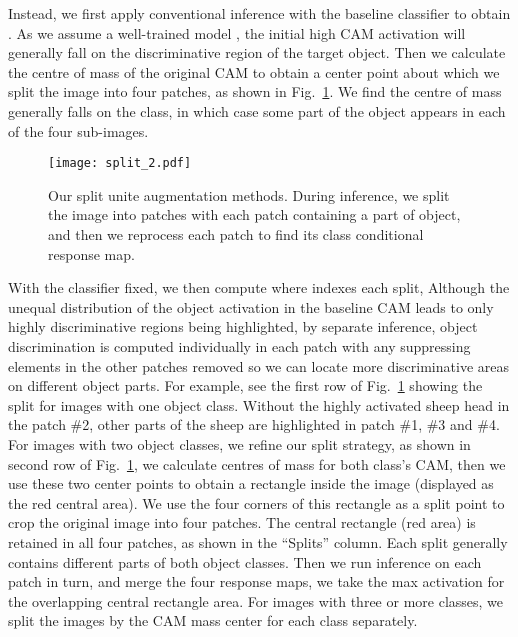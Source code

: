 \documentclass[10pt,twocolumn,letterpaper]{article}
\begin{document}
Instead, we first apply conventional inference with the baseline classifier to obtain
.
As we assume a well-trained model , the initial high CAM activation will generally fall on the discriminative region of the target object. 
Then we calculate the centre of mass of the original CAM to obtain a center point about which we split the image into four patches, as shown in Fig.~\ref{fig:split}. We find the centre of mass generally falls on the class, in which case some part of the object appears 
in each of the four sub-images. 

\begin{figure}[!htb]
   \begin{center}
   {\texttt{[image: split\_2.pdf]}} 
   \end{center}
 \vspace{-3mm}
\caption{Our split  unite augmentation methods. 
During inference, we split the image into
patches with each patch containing a part of object,
and then we reprocess
each patch to find its
class conditional response map.
}
\vspace{-2mm}
   \label{fig:split}
\end{figure}

With the classifier fixed, we then compute  where  indexes each split,
Although the unequal distribution of the object activation in the baseline CAM leads to only highly discriminative regions being highlighted,
by separate inference, object discrimination is computed individually in each patch with any suppressing elements in the other patches removed so we can locate more discriminative areas on different object parts.
For example, see the first row of Fig.~\ref{fig:split} showing the split for images with one object class.
Without the highly activated sheep head in the patch \#2, other parts of the sheep are highlighted in patch \#1, \#3 and \#4.
For images with two object classes, we refine our split strategy,
as shown in second row of Fig.~\ref{fig:split}, we calculate centres of
mass for both class's CAM, then we use these two center points to obtain a rectangle inside the image (displayed as the red central area). 
We use the four corners of this rectangle as a split point to crop the original image into four patches. 
The central rectangle (red area) is retained in all four patches, as shown in the \enquote{Splits} column. Each split generally contains different parts of both object classes.
Then we run inference on each patch in turn, and merge the four response maps, we take the max activation for the overlapping central rectangle area. 
For images with three or more classes, we split the images by the CAM mass center for each class separately.
\end{document}
